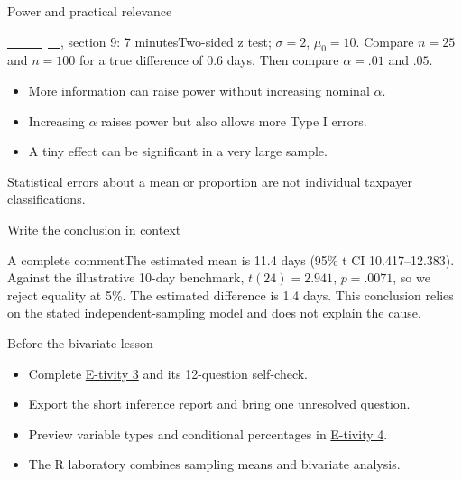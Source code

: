 \begin{frame}{Power and practical relevance}
\begin{block}{\href{https://silviasaliniunimi.github.io/data-analysis-tax-compliance/03-inference.html}{\textcolor{white}{E-tivity 3}}, section 9: 7 minutes}Two-sided z test; $\sigma=2$, $\mu_0=10$. Compare $n=25$ and $n=100$ for a true difference of 0.6 days. Then compare $\alpha=.01$ and $.05$.\end{block}
\begin{itemize}\item More information can raise power without increasing nominal $\alpha$.\item Increasing $\alpha$ raises power but also allows more Type I errors.\item A tiny effect can be significant in a very large sample.\end{itemize}
Statistical errors about a mean or proportion are not individual taxpayer classifications.
\end{frame}
\begin{frame}{Write the conclusion in context}
\begin{block}{A complete comment}The estimated mean is 11.4 days (95\% t CI 10.417--12.383). Against the illustrative 10-day benchmark, $t(24)=2.941$, $p=.0071$, so we reject equality at 5\%. The estimated difference is 1.4 days. This conclusion relies on the stated independent-sampling model and does not explain the cause.\end{block}
\end{frame}
\begin{frame}{Before the bivariate lesson}
\begin{itemize}
\item Complete \href{https://silviasaliniunimi.github.io/data-analysis-tax-compliance/03-inference.html}{E-tivity 3} and its 12-question self-check.
\item Export the short inference report and bring one unresolved question.
\item Preview variable types and conditional percentages in \href{https://silviasaliniunimi.github.io/data-analysis-tax-compliance/04-bivariate.html}{E-tivity 4}.
\item The R laboratory combines sampling means and bivariate analysis.
\end{itemize}
\end{frame}
